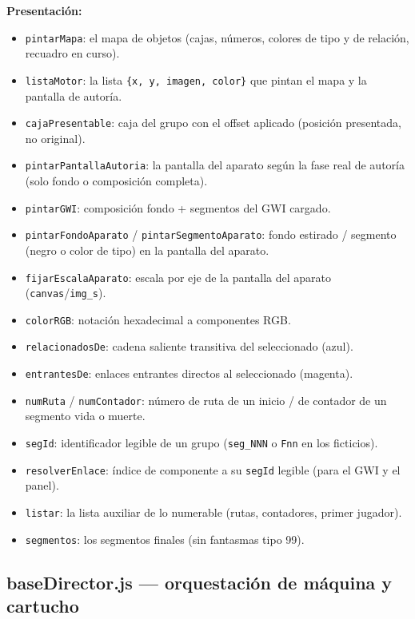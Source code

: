 \documentclass[../main.tex]{subfiles}
\begin{document}
\textbf{Presentación:}
\begin{itemize}
	\item \texttt{pintarMapa}: el mapa de objetos (cajas, números,
	colores de tipo y de relación, recuadro en curso).
	\item \texttt{listaMotor}: la lista \texttt{\{x, y, imagen, color\}}
	que pintan el mapa y la pantalla de autoría.
	\item \texttt{cajaPresentable}: caja del grupo con el offset aplicado
	(posición presentada, no original).
	\item \texttt{pintarPantallaAutoria}: la pantalla del aparato según
	la fase real de autoría (solo fondo o composición completa).
	\item \texttt{pintarGWI}: composición fondo + segmentos del GWI
	cargado.
	\item \texttt{pintarFondoAparato} / \texttt{pintarSegmentoAparato}:
	fondo estirado / segmento (negro o color de tipo) en la pantalla del
	aparato.
	\item \texttt{fijarEscalaAparato}: escala por eje de la pantalla del
	aparato (\texttt{canvas}/\texttt{img\_s}).
	\item \texttt{colorRGB}: notación hexadecimal a componentes RGB.
	\item \texttt{relacionadosDe}: cadena saliente transitiva del
	seleccionado (azul).
	\item \texttt{entrantesDe}: enlaces entrantes directos al
	seleccionado (magenta).
	\item \texttt{numRuta} / \texttt{numContador}: número de ruta de un
	inicio / de contador de un segmento vida o muerte.
	\item \texttt{segId}: identificador legible de un grupo
	(\texttt{seg\_NNN} o \texttt{Fnn} en los ficticios).
	\item \texttt{resolverEnlace}: índice de componente a su
	\texttt{segId} legible (para el GWI y el panel).
	\item \texttt{listar}: la lista auxiliar de lo numerable (rutas,
	contadores, primer jugador).
	\item \texttt{segmentos}: los segmentos finales (sin fantasmas
	tipo 99).
\end{itemize}

\subsection*{baseDirector.js — orquestación de máquina y cartucho}
\end{document}
